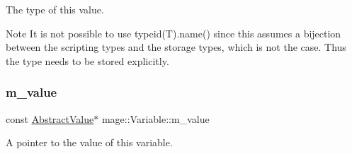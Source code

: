 The type of this value.

\begin{DoxyNote}{Note}
It is not possible to use typeid(\+T).name() since this assumes a bijection between the scripting types and the storage types, which is not the case. Thus the type needs to be stored explicitly. 
\end{DoxyNote}
\hypertarget{structmage_1_1_variable_a99388f3fbccf983b8d6954fd31d0eb27}{}\label{structmage_1_1_variable_a99388f3fbccf983b8d6954fd31d0eb27} 
\subsubsection{\texorpdfstring{m\+\_\+value}{m\_value}}
{\footnotesize\ttfamily const \hyperlink{structmage_1_1_variable_1_1_abstract_value}{Abstract\+Value}$\ast$ mage\+::\+Variable\+::m\+\_\+value\hspace{0.3cm}{\ttfamily [private]}}

A pointer to the value of this variable. 